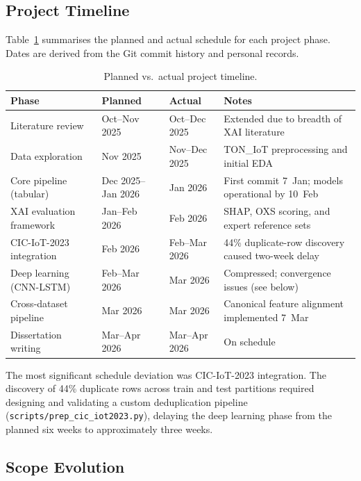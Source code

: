 \documentclass[12pt,a4paper]{report}
\begin{document}
\subsection*{Project Timeline}

Table~\ref{tab:project-timeline} summarises the planned and actual schedule for each project phase. Dates are derived from the Git commit history and personal records.

\begin{table}[htbp]
\centering
\caption{Planned vs.\ actual project timeline.}
\label{tab:project-timeline}
\small
\begin{tabular}{p{3.8cm} p{2.5cm} p{2.5cm} p{4.5cm}}
\toprule
\textbf{Phase} & \textbf{Planned} & \textbf{Actual} & \textbf{Notes} \\
\midrule
Literature review        & Oct--Nov 2025 & Oct--Dec 2025 & Extended due to breadth of XAI literature \\
Data exploration         & Nov 2025      & Nov--Dec 2025 & TON\_IoT preprocessing and initial EDA \\
Core pipeline (tabular)  & Dec 2025--Jan 2026 & Jan 2026 & First commit 7~Jan; models operational by 10~Feb \\
XAI evaluation framework & Jan--Feb 2026 & Feb 2026 & SHAP, OXS scoring, and expert reference sets \\
CIC-IoT-2023 integration & Feb 2026      & Feb--Mar 2026 & 44\% duplicate-row discovery caused two-week delay \\
Deep learning (CNN-LSTM) & Feb--Mar 2026 & Mar 2026      & Compressed; convergence issues (see below) \\
Cross-dataset pipeline   & Mar 2026      & Mar 2026      & Canonical feature alignment implemented 7~Mar \\
Dissertation writing     & Mar--Apr 2026 & Mar--Apr 2026 & On schedule \\
\bottomrule
\end{tabular}
\end{table}

The most significant schedule deviation was CIC-IoT-2023 integration. The discovery of 44\% duplicate rows across train and test partitions required designing and validating a custom deduplication pipeline (\texttt{scripts/prep\_cic\_iot2023.py}), delaying the deep learning phase from the planned six weeks to approximately three weeks.

\subsection*{Scope Evolution}
\end{document}
